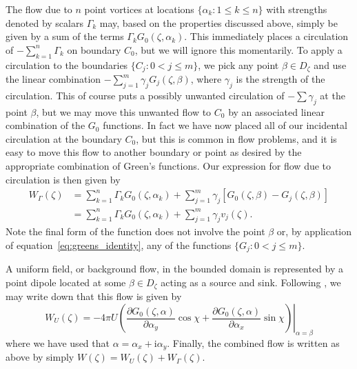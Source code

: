\documentclass[12pt,fleqn]{article}
\renewcommand{\i}{\mathrm{i}}
\begin{document}
The flow due to $n$ point vortices at locations $\{\alpha_k:1\le k\le n\}$ with strengths denoted by scalars $\Gamma_k$ may, based on the properties discussed above, simply be given by a sum of the terms $\Gamma_k G_0(\zeta,\alpha_k)$. This immediately places a circulation of $-\sum_{k=1}^n \Gamma_k$ on boundary $C_0$, but we will ignore this momentarily. To apply a circulation to the boundaries $\{C_j:0<j\le m\}$, we pick any point $\beta\in D_\zeta$ and use the linear combination $-\sum_{j=1}^m \gamma_j G_j(\zeta,\beta)$, where $\gamma_j$ is the strength of the circulation. This of course puts a possibly unwanted circulation of $-\sum \gamma_j$ at the point $\beta$, but we may move this unwanted flow to $C_0$ by an associated linear combination of the $G_0$ functions. In fact we have now placed all of our incidental circulation at the boundary $C_0$, but this is common in flow problems, and it is easy to move this flow to another boundary or point as desired by the appropriate combination of Green's functions. Our expression for flow due to circulation is then given by
\begin{equation}
  \begin{split}
    W_\Gamma(\zeta) &= \sum_{k=1}^n \Gamma_k G_0(\zeta,\alpha_k) + \sum_{j=1}^m \gamma_j \left[ G_0(\zeta,\beta) - G_j(\zeta,\beta) \right] \\
    &= \sum_{k=1}^n \Gamma_k G_0(\zeta,\alpha_k) + \sum_{j=1}^m \gamma_j v_j(\zeta).
  \end{split}
  \label{eq:bvorticesmc}
\end{equation}
Note the final form of the function does not involve the point $\beta$ or, by application of equation~\eqref{eq:greens_identity}, any of the functions $\{G_j:0<j\le m\}$.

A uniform field, or background flow, in the bounded domain is represented by a point dipole located at some $\beta\in D_\zeta$ acting as a source and sink.
Following \cite{newcalculus}, we may write down that this flow is given by
\begin{equation}
  W_U(\zeta) = -4\pi U\left. \left( \frac{\partial G_0(\zeta,\alpha)}{\partial \alpha_y}\cos\chi + \frac{\partial G_0(\zeta,\alpha)}{\partial \alpha_x}\sin\chi \right) \right|_{\alpha = \beta}
  \label{eq:backgroudmc}
\end{equation}
where we have used that $\alpha = \alpha_x + \i\alpha_y$.
Finally, the combined flow is written as above by simply $W(\zeta) = W_U(\zeta) + W_\Gamma(\zeta)$.
\end{document}
